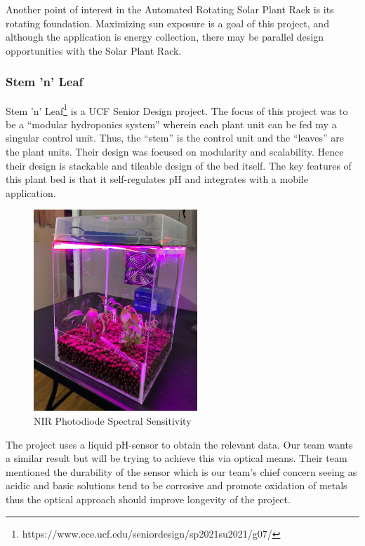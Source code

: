 Another point of interest in the Automated Rotating Solar Plant Rack is its rotating foundation. Maximizing sun exposure is a goal of this project, and although the application is energy collection, there may be parallel design opportunities with the Solar Plant Rack.


\subsubsection{Stem 'n' Leaf}
Stem 'n' Leaf\footnote{https://www.ece.ucf.edu/seniordesign/sp2021su2021/g07/} is a UCF Senior Design project. The focus of this project was to be a ``modular hydroponics system'' wherein each plant unit can be fed my a singular control unit. Thus, the ``stem'' is the control unit and the ``leaves'' are the plant units. Their design was focused on modularity and scalability. Hence their design is stackable and tileable design of the bed itself. The key features of this plant bed is that it self-regulates pH and integrates with a mobile application.
\begin{figure}[H]
    \caption{NIR Photodiode Spectral Sensitivity}
    \centering
    \includegraphics[width=.6\textwidth]{images/3.1.5Pic.png}
\end{figure}

The project uses a liquid pH-sensor to obtain the relevant data. Our team wants a similar result but will be trying to achieve this via optical means. Their team mentioned the durability of the sensor which is our team's chief concern seeing as acidic and basic solutions tend to be corrosive and promote oxidation of metals thus the optical approach should improve longevity of the project. 

